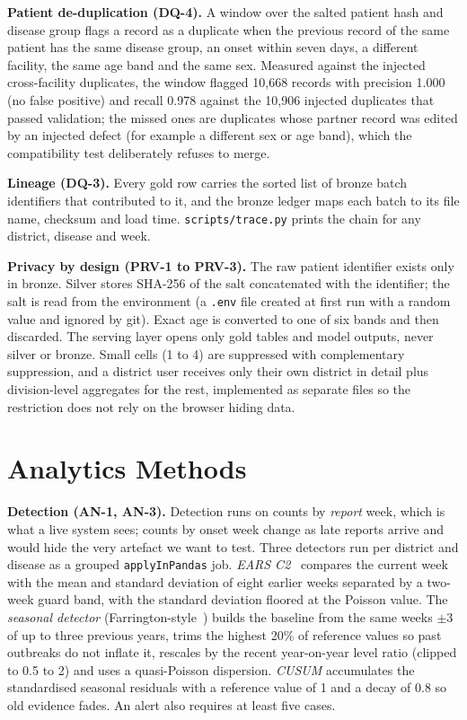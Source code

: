 \documentclass[conference]{IEEEtran}
\begin{document}
\textbf{Patient de-duplication (DQ-4).} A window over the salted patient hash and disease group flags a record as a duplicate when the previous record of the same patient has the same disease group, an onset within seven days, a different facility, the same age band and the same sex. Measured against the injected cross-facility duplicates, the window flagged 10,668 records with precision 1.000 (no false positive) and recall 0.978 against the 10,906 injected duplicates that passed validation; the missed ones are duplicates whose partner record was edited by an injected defect (for example a different sex or age band), which the compatibility test deliberately refuses to merge.

\textbf{Lineage (DQ-3).} Every gold row carries the sorted list of bronze batch identifiers that contributed to it, and the bronze ledger maps each batch to its file name, checksum and load time. \texttt{scripts/trace.py} prints the chain for any district, disease and week.

\textbf{Privacy by design (PRV-1 to PRV-3).} The raw patient identifier exists only in bronze. Silver stores SHA-256 of the salt concatenated with the identifier; the salt is read from the environment (a \texttt{.env} file created at first run with a random value and ignored by git). Exact age is converted to one of six bands and then discarded. The serving layer opens only gold tables and model outputs, never silver or bronze. Small cells (1 to 4) are suppressed with complementary suppression, and a district user receives only their own district in detail plus division-level aggregates for the rest, implemented as separate files so the restriction does not rely on the browser hiding data.
\section{Analytics Methods}\label{sec:methods}
\textbf{Detection (AN-1, AN-3).} Detection runs on counts by \emph{report} week, which is what a live system sees; counts by onset week change as late reports arrive and would hide the very artefact we want to test. Three detectors run per district and disease as a grouped \texttt{applyInPandas} job. \emph{EARS C2}~\cite{ears} compares the current week with the mean and standard deviation of eight earlier weeks separated by a two-week guard band, with the standard deviation floored at the Poisson value. The \emph{seasonal detector} (Farrington-style~\cite{farr}) builds the baseline from the same weeks $\pm3$ of up to three previous years, trims the highest 20\% of reference values so past outbreaks do not inflate it, rescales by the recent year-on-year level ratio (clipped to 0.5 to 2) and uses a quasi-Poisson dispersion. \emph{CUSUM} accumulates the standardised seasonal residuals with a reference value of 1 and a decay of 0.8 so old evidence fades. An alert also requires at least five cases.
\end{document}
